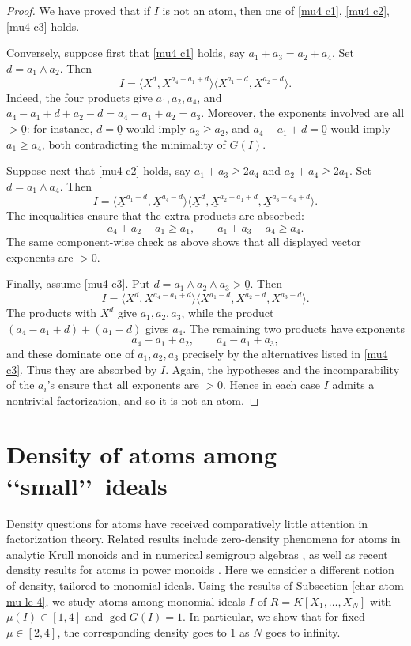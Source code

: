 \documentclass[a4paper,10pt,reqno]{amsart}
\theoremstyle{definition}
\theoremstyle{definition}
\begin{document}
\begin{proof}
We have proved that if $I$ is not an atom, then one of \ref{mu4 c1}, \ref{mu4 c2}, \ref{mu4 c3} holds.

Conversely, suppose first that \ref{mu4 c1} holds, say $a_1+a_3=a_2+a_4.$ Set $d=a_1\wedge a_2$. Then
\[
I=
\langle \underline X^d, \underline X^{a_4-a_1+d}\rangle
\langle \underline X^{a_1-d},\underline X^{a_2-d}\rangle .
\]
Indeed, the four products give $a_1,a_2,a_4$, and $a_4-a_1+d+a_2-d=a_4-a_1+a_2=a_3.$ Moreover, the exponents involved are all $>\underline 0$: for instance, $d=\underline 0$ would imply $a_3\ge a_2$, and $a_4-a_1+d=\underline 0$ would imply $a_1\ge a_4$, both contradicting the minimality of $G(I)$.

Suppose next that \ref{mu4 c2} holds, say $a_1+a_3\ge 2a_4$ and $a_2+a_4\ge 2a_1.$ Set $d=a_1\wedge a_4$. Then
\[
I=
\langle \underline X^{a_1-d},\underline X^{a_4-d}\rangle
\langle \underline X^d,\underline X^{a_2-a_1+d},\underline X^{a_3-a_4+d}\rangle .
\]
The inequalities ensure that the extra products are absorbed:
\[
a_4+a_2-a_1\ge a_1,\qquad a_1+a_3-a_4\ge a_4.
\]
The same component-wise check as above shows that all displayed vector exponents are $>\underline 0$.

Finally, assume \ref{mu4 c3}. Put $d=a_1\wedge a_2\wedge a_3>\underline 0.$ Then
\[
I=
\langle \underline X^d,\underline X^{a_4-a_1+d}\rangle
\langle \underline X^{a_1-d},\underline X^{a_2-d},\underline X^{a_3-d}\rangle .
\]
The products with $\underline X^d$ give $a_1,a_2,a_3$, while the product $(a_4-a_1+d)+(a_1-d)$ gives $a_4$. The remaining two products have exponents
\[
a_4-a_1+a_2,\qquad a_4-a_1+a_3,
\]
and these dominate one of $a_1,a_2,a_3$ precisely by the alternatives listed in \ref{mu4 c3}. Thus they are absorbed by $I$. Again, the hypotheses and the incomparability of the $a_i$'s ensure that all exponents are $>\underline 0$. Hence in each case $I$ admits a nontrivial factorization, and so it is not an atom.
\end{proof}

\section{Density of atoms among \lq\lq small\rq\rq\ ideals}

Density questions for atoms have received comparatively little attention in factorization theory. Related results include zero-density phenomena for atoms in analytic Krull monoids \cite[Chapter~9]{Ge-HK} and in numerical semigroup algebras \cite{AEKOT22}, as well as recent density results for atoms in power monoids \cite{BiGe25, Agg-Got-Lu-2025}. Here we consider a different notion of density, tailored to monomial ideals. Using the results of Subsection \ref{char atom mu le 4}, we study atoms among monomial ideals $I$ of $R=K[X_1,\dots,X_N]$ with $\mu(I)\in [1,4]$ and $\gcd{G(I)}=1$. In particular, we show that for fixed $\mu\in[2,4]$, the corresponding density goes to $1$ as $N$ goes to infinity.
\end{document}
